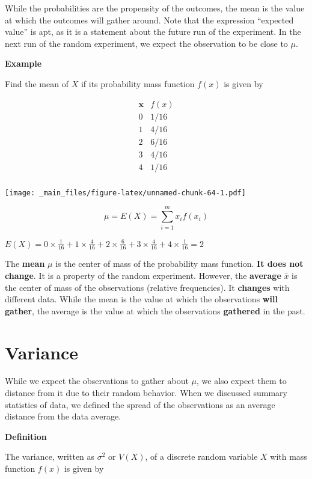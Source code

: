\documentclass[
]{book}
\begin{document}
While the probabilities are the propensity of the outcomes, the mean is the value at which the outcomes will gather around. Note that the expression ``expected value'' is apt, as it is a statement about the future run of the experiment. In the next run of the random experiment, we expect the observation to be close to \(\mu\).

\textbf{Example}

Find the mean of \(X\) if its probability mass function \(f(x)\) is given by

\[
\begin{array}{cc}
\mathbf{x} & f(x) \\
0 & 1/16 \\
1 & 4/16 \\
2 & 6/16 \\
3 & 4/16 \\
4 & 1/16 \\
\end{array}
\]

\texttt{[image: \_main\_files/figure-latex/unnamed-chunk-64-1.pdf]}

\[ \mu =E(X)=\sum_{i=1}^m x_i f(x_i) \]

\(E(X)=0 \times \frac{1}{16} + 1 \times \frac{4}{16} + 2 \times \frac{6}{16} + 3 \times \frac{4}{16} + 4 \times \frac{1}{16} =2\)

The \textbf{mean} \(\mu\) is the center of mass of the probability mass function. \textbf{It does not change}. It is a property of the random experiment. However, the \textbf{average} \(\bar{x}\) is the center of mass of the observations (relative frequencies). It \textbf{changes} with different data. While the mean is the value at which the observations \textbf{will gather}, the average is the value at which the observations \textbf{gathered} in the past.

\hypertarget{variance}{%
\section{Variance}\label{variance}}

While we expect the observations to gather about \(\mu\), we also expect them to distance from it due to their random behavior. When we discussed summary statistics of data, we defined the spread of the observations as an average distance from the data average.

\textbf{Definition}

The variance, written as \(\sigma^2\) or \(V(X)\), of a discrete random variable \(X\) with mass function \(f(x)\) is given by
\end{document}
